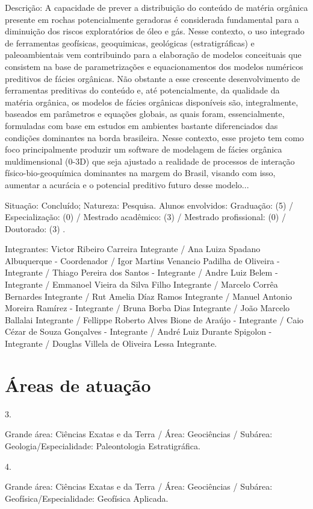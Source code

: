 \documentclass[10pt]{article}
\begin{document}
Descrição: A capacidade de prever a distribuição do conteúdo de matéria orgânica presente em rochas potencialmente geradoras é considerada fundamental para a diminuição dos riscos exploratórios de óleo e gás. Nesse contexto, o uso integrado de ferramentas geofísicas, geoquimicas, geológicas (estratigráficas) e paleoambientais vem contribuindo para a elaboração de modelos conceituais que consistem na base de parametrizações e equacionamentos dos modelos numéricos preditivos de fácies orgânicas. Não obstante a esse crescente desenvolvimento de ferramentas preditivas do conteúdo e, até potencialmente, da qualidade da matéria orgânica, os modelos de fácies orgânicas disponíveis são, integralmente, baseados em parâmetros e equações globais, as quais foram, essencialmente, formuladas com base em estudos em ambientes bastante diferenciados das condições dominantes na borda brasileira. Nesse contexto, esse projeto tem como foco principalmente produzir um software de modelagem de fácies orgânica muldimensional (0-3D) que seja ajustado a realidade de processos de interação físico-bio-geoquímica dominantes na margem do Brasil, visando com isso, aumentar a acurácia e o potencial preditivo futuro desse modelo...

Situação: Concluído; Natureza: Pesquisa. Alunos envolvidos: Graduação: (5) / Especialização: (0) / Mestrado acadêmico: (3) / Mestrado profissional: (0) / Doutorado: (3) .

Integrantes: Victor Ribeiro Carreira Integrante / Ana Luiza Spadano Albuquerque - Coordenador / Igor Martins Venancio Padilha de Oliveira - Integrante / Thiago Pereira dos Santos - Integrante / Andre Luiz Belem - Integrante / Emmanoel Vieira da Silva Filho Integrante / Marcelo Corrêa Bernardes Integrante / Rut Amelia Díaz Ramos Integrante / Manuel Antonio Moreira Ramírez - Integrante / Bruna Borba Dias Integrante / João Marcelo Ballalai Integrante / Fellippe Roberto Alves Bione de Araújo - Integrante / Caio Cézar de Souza Gonçalves - Integrante / André Luiz Durante Spigolon - Integrante / Douglas Villela de Oliveira Lessa Integrante.

\section*{Áreas de atuação}
3.

Grande área: Ciências Exatas e da Terra / Área: Geociências / Subárea: Geologia/Especialidade: Paleontologia Estratigráfica.

4.

Grande área: Ciências Exatas e da Terra / Área: Geociências / Subárea: Geofísica/Especialidade: Geofísica Aplicada.
\end{document}
